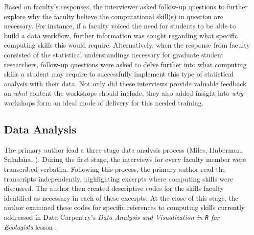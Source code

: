 \documentclass[12pt]{article}
\begin{document}
\quad Based on faculty's responses, the interviewer asked follow-up questions to
further explore why the faculty believe the computational skill(s) in question 
are necessary. For instance, if a faculty voiced the need for students to be 
able to build a data workflow, further information was sought regarding what 
specific computing skills this would require. Alternatively, when the response 
from faculty consisted of the statistical understandings necessary for graduate
student researchers, follow-up questions were asked to delve further into what
computing skills a student may require to successfully implement this type of
statistical analysis with their data. Not only did these interviews provide
valuable feedback on \emph{what} content the workshops should include, they also
added insight into \emph{why} workshops form an ideal mode of delivery for this
needed training.  

\subsection{Data Analysis} 

\quad The primary author lead a three-stage data analysis process (Miles, 
Huberman, Salada$\tilde{\text{n}}$a, \citeyear{miles}). During the first stage,
the interviews for every faculty member were transcribed verbatim. Following 
this process, the primary author read the transcripts independently, 
highlighting excerpts where computing skills were discussed. The author then 
created descriptive codes for the skills faculty identified as necessary in each
of these excerpts. At the close of this stage, the author examined these codes 
for specific references to computing skills currently addressed in Data 
Carpentry's \emph{Data Analysis and Visualization in \texttt{R} for Ecologists} 
lesson \citep{ecology_curriculum}. 
\end{document}
